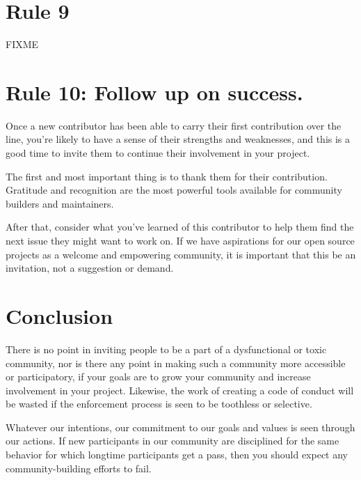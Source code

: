 \documentclass[10pt,letterpaper]{article}
\newcommand{\rulemajor}[1]{\section{#1}}
\begin{document}
\rulemajor{Rule 9}

FIXME

\rulemajor{Rule 10: Follow up on success.}

Once a new contributor has been able to carry their first contribution over the line, 
you're likely to have a sense of their strengths and weaknesses,
and this is a good time to invite them to continue their involvement in your project.

The first and most important thing is to thank them for their contribution.
Gratitude and recognition are the most powerful tools available for community builders and maintainers. 

After that,
consider what you've learned of this contributor to help them find
the next issue they might want to work on.
If we have aspirations for our open source projects as a welcome and empowering community,
it is important that this be an invitation,
not a suggestion or demand. 

\section*{Conclusion}

There is no point in inviting people to be a part of a dysfunctional or toxic community,
nor is there any point in making such a community more accessible or participatory,
if your goals are to grow your community and increase involvement in your project.
Likewise,
the work of creating a code of conduct will be wasted
if the enforcement process is seen to be toothless or selective.

Whatever our intentions,
our commitment to our goals and values is seen through our actions.
If new participants in our community are disciplined for the same behavior
for which longtime participants get a pass,
then you should expect any community-building efforts to fail.


\end{document}
